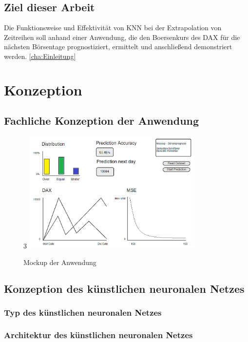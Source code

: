 \documentclass[a4paper,DIV11,bibliography=totoc,headings=normal,ngerman,headsepline,listof=totoc]{scrreprt}
\begin{document}
\section{Ziel dieser Arbeit}
\label{sec:Ziel}
Die Funktionsweise und Effektivität von KNN bei der Extrapolation von Zeitreihen soll anhand einer Anwendung, die den Boersenkurs des DAX für die nächsten Börsentage prognostiziert, ermittelt und anschließend demonstriert werden.
\ref{cha:Einleitung}
 
\chapter{Konzeption} %
\label{cha:Konzeption}
\section{Fachliche Konzeption der Anwendung} %
\label{sec:Konzeption Anwendung}

\begin{figure}[htbp]3
\centering
		\includegraphics[width=0.80\textwidth]{mockup.PNG}
	\caption{Mockup der Anwendung}
	\label{fig:Mockup der Anwendung}
\end{figure}


\section{Konzeption des künstlichen neuronalen Netzes} %
\subsection{Typ des künstlichen neuronalen Netzes} %
\subsection{Architektur des künstlichen neuronalen Netzes} %
\end{document}
